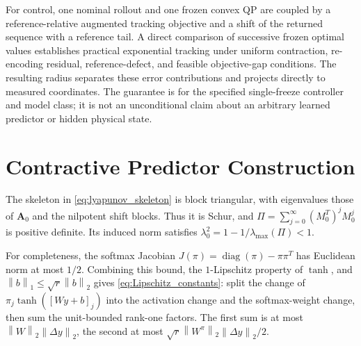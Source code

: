 \documentclass[journal]{IEEEtran}
\theoremstyle{plain}
\theoremstyle{definition}
\newcommand{\mA}{\mathbf{A}}
\newcommand{\norm}[1]{\left\lVert #1\right\rVert}
\begin{document}
For control, one nominal rollout and one frozen convex QP are coupled by a reference-relative augmented tracking objective and a shift of the returned sequence with a reference tail. A direct comparison of successive frozen optimal values establishes practical exponential tracking under uniform contraction, re-encoding residual, reference-defect, and feasible objective-gap conditions. The resulting radius separates these error contributions and projects directly to measured coordinates. The guarantee is for the specified single-freeze controller and model class; it is not an unconditional claim about an arbitrary learned predictor or hidden physical state.

\appendices
\section{Contractive Predictor Construction}
\label{app:construction}
The skeleton in \eqref{eq:lyapunov_skeleton} is block triangular, with eigenvalues those of $\mA_0$ and the nilpotent shift blocks. Thus it is Schur, and $\Pi=\sum_{j=0}^{\infty}(M_0^T)^jM_0^j$ is positive definite. Its induced norm satisfies $\lambda_0^2=1-1/\lambda_{\max}(\Pi)<1$.

For completeness, the softmax Jacobian $J(\pi)=\operatorname{diag}(\pi)-\pi\pi^T$ has Euclidean norm at most $1/2$. Combining this bound, the $1$-Lipschitz property of $\tanh$, and $\norm{b}_1\le\sqrt r\norm{b}_2$ gives \eqref{eq:Lipschitz_constants}: split the change of $\pi_j\tanh([Wy+b]_j)$ into the activation change and the softmax-weight change, then sum the unit-bounded rank-one factors. The first sum is at most $\norm{W}_2\norm{\Delta y}_2$, the second at most $\sqrt r\norm{W^\pi}_2\norm{\Delta y}_2/2$.
\end{document}
